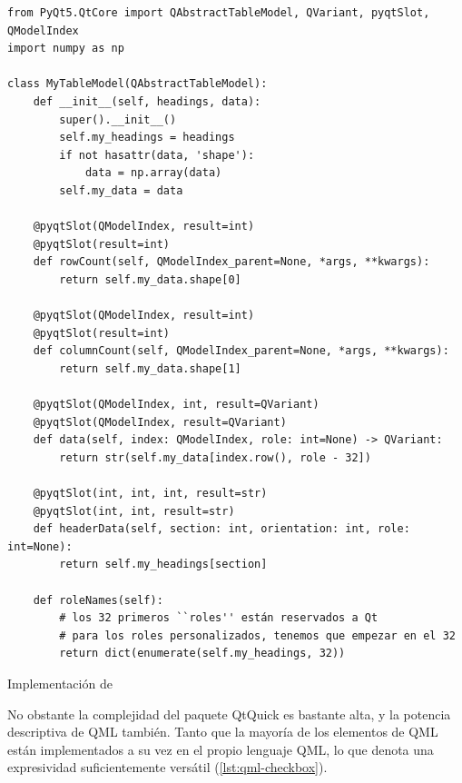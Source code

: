 \begin{listing}[htbp]
\begin{verbatim}
from PyQt5.QtCore import QAbstractTableModel, QVariant, pyqtSlot, QModelIndex
import numpy as np

class MyTableModel(QAbstractTableModel):
    def __init__(self, headings, data):
        super().__init__()
        self.my_headings = headings
        if not hasattr(data, 'shape'):
            data = np.array(data)
        self.my_data = data

    @pyqtSlot(QModelIndex, result=int)
    @pyqtSlot(result=int)
    def rowCount(self, QModelIndex_parent=None, *args, **kwargs):
        return self.my_data.shape[0]

    @pyqtSlot(QModelIndex, result=int)
    @pyqtSlot(result=int)
    def columnCount(self, QModelIndex_parent=None, *args, **kwargs):
        return self.my_data.shape[1]

    @pyqtSlot(QModelIndex, int, result=QVariant)
    @pyqtSlot(QModelIndex, result=QVariant)
    def data(self, index: QModelIndex, role: int=None) -> QVariant:
        return str(self.my_data[index.row(), role - 32])

    @pyqtSlot(int, int, int, result=str)
    @pyqtSlot(int, int, result=str)
    def headerData(self, section: int, orientation: int, role: int=None):
        return self.my_headings[section]

    def roleNames(self):
        # los 32 primeros ``roles'' están reservados a Qt
        # para los roles personalizados, tenemos que empezar en el 32
        return dict(enumerate(self.my_headings, 32))
\end{verbatim}
\caption{Implementación de }
\label{lst:MyTableModel}
\end{listing}

No obstante la complejidad del paquete QtQuick es bastante alta, y la potencia descriptiva de QML también. Tanto que la mayoría de los elementos de QML están implementados a su vez en el propio lenguaje QML, lo que denota una expresividad suficientemente versátil (\autoref{lst:qml-checkbox}).

